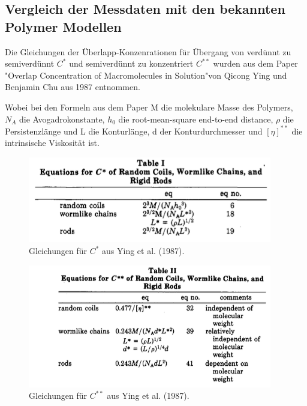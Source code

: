 \newpage
\subsection{Vergleich der Messdaten mit den bekannten Polymer Modellen}

Die Gleichungen der Überlapp-Konzenrationen für Übergang von verdünnt zu semiverdünnt $C^*$ und semiverdünnt zu konzentriert $C^{**}$ wurden aus dem Paper "Overlap Concentration of Macromolecules in Solution"von Qicong Ying und Benjamin Chu aus 1987 entnommen.

Wobei bei den Formeln aus dem Paper M die molekulare Masse des Polymers, $N_A$ die Avogadrokonstante, $h_0$ die root-mean-square end-to-end distance, $\rho$ die Persistenzlänge und L die Konturlänge, d der Konturdurchmesser und $[\eta]^{**}$ die intrinsische Viskosität ist.

\begin{figure}[h]
	\includegraphics[width=0.95\textwidth]{Bilder/Auswertung/43/YingT1.png}
	\caption[short]{Gleichungen für $C^*$ aus Ying et al. (1987).}
\end{figure}


\begin{figure}[h]
	\includegraphics[width=0.95\textwidth]{Bilder/Auswertung/43/YingT2.png}
	\caption[short]{Gleichungen für $C^{**}$ aus Ying et al. (1987).}
\end{figure}